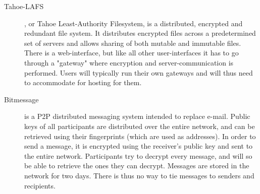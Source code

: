 \begin{description}
  \item[Tahoe-LAFS] \cite{Tahoe:2014:Online}, or Tahoe Least-Authority Filesystem, is a distributed, encrypted and redundant file system. It distributes encrypted files across a predetermined set of servers and allows sharing of both mutable and immutable files. There is a web-interface, but like all other user-interfaces it has to go through a "gateway" where encryption and server-communication is performed. Users will typically run their own gateways and will thus need to accommodate for hosting for them. 
  \item[Bitmessage] \cite{Bitmessage:2014:Online} is a P2P distributed messaging system intended to replace e-mail. Public keys of all participants are distributed over the entire network, and can be retrieved using their fingerprints (which are used as addresses). In order to send a message, it is encrypted using the receiver's public key and sent to the entire network. Participants try to decrypt every message, and will so be able to retrieve the ones they can decrypt. Messages are stored in the network for two days. There is thus no way to tie messages to senders and recipients.
\end{description}

